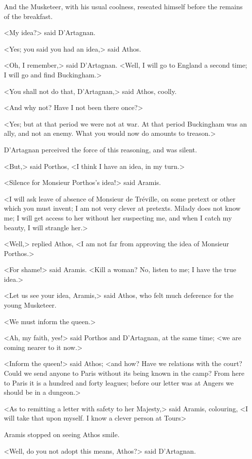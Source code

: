 And the Musketeer, with his usual coolness, reseated himself before the remains of the breakfast. 

<My idea?> said D'Artagnan. 

<Yes; you said you had an idea,> said Athos. 

<Oh, I remember,> said D'Artagnan. <Well, I will go to England a second time; I will go and find Buckingham.> 

<You shall not do that, D'Artagnan,> said Athos, coolly. 

<And why not? Have I not been there once?> 

<Yes; but at that period we were not at war. At that period Buckingham was an ally, and not an enemy. What you would now do amounts to treason.> 

D'Artagnan perceived the force of this reasoning, and was silent. 

<But,> said Porthos, <I think I have an idea, in my turn.> 

<Silence for Monsieur Porthos's idea!> said Aramis. 

<I will ask leave of absence of Monsieur de Tréville, on some pretext or other which you must invent; I am not very clever at pretexts. Milady does not know me; I will get access to her without her suspecting me, and when I catch my beauty, I will strangle her.> 

<Well,> replied Athos, <I am not far from approving the idea of Monsieur Porthos.> 

<For shame!> said Aramis. <Kill a woman? No, listen to me; I have the true idea.> 

<Let us see your idea, Aramis,> said Athos, who felt much deference for the young Musketeer. 

<We must inform the queen.> 

<Ah, my faith, yes!> said Porthos and D'Artagnan, at the same time; <we are coming nearer to it now.> 

<Inform the queen!> said Athos; <and how? Have we relations with the court? Could we send anyone to Paris without its being known in the camp? From here to Paris it is a hundred and forty leagues; before our letter was at Angers we should be in a dungeon.> 

<As to remitting a letter with safety to her Majesty,> said Aramis, colouring, <I will take that upon myself. I know a clever person at Tours\longdash> 

Aramis stopped on seeing Athos smile. 

<Well, do you not adopt this means, Athos?> said D'Artagnan. 

